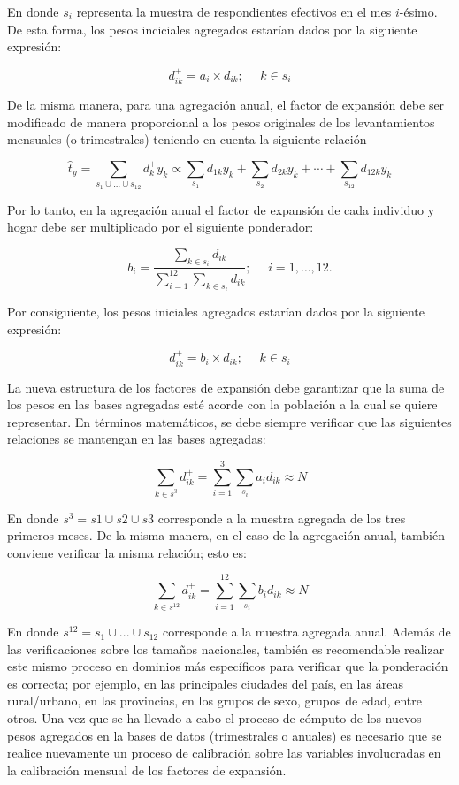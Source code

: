 \documentclass[
  12pt,
  spanish,
]{book}
\begin{document}
En donde \(s_i\) representa la muestra de respondientes efectivos en el mes \(i\)-ésimo. De esta forma, los pesos inciciales agregados estarían dados por la siguiente expresión:

\[
d_{ik}^+ = a_i \times d_{ik} ; \ \ \ \ \ \ k\in s_i
\]

De la misma manera, para una agregación anual, el factor de expansión
debe ser modificado de manera proporcional a los pesos originales de los
levantamientos mensuales (o trimestrales) teniendo en cuenta la
siguiente relación

\[
\hat{t}_y = \sum_{s_1 \cup ... \cup s_{12}} d_{k}^+ y_k
\propto 
\sum_{s_1} d_{1k} y_k + \sum_{s_2} d_{2k} y_k + \cdots + \sum_{s_{12}} d_{12k} y_k
\]

Por lo tanto, en la agregación anual el factor de expansión de cada
individuo y hogar debe ser multiplicado por el siguiente ponderador:

\[
b_i = \frac{\sum_{k\in s_i}d_{ik}}{\sum_{i=1}^{12}\sum_{k\in s_i}d_{ik}} ; \ \ \ \ \ \ i= 1, \ldots, 12.
\]

Por consiguiente, los pesos iniciales agregados estarían dados por la siguiente expresión:

\[
d_{ik}^+ = b_i \times d_{ik} ; \ \ \ \ \ \ k\in s_i
\]

La nueva estructura de los factores de expansión debe garantizar que la
suma de los pesos en las bases agregadas esté acorde con la población a
la cual se quiere representar. En términos matemáticos, se debe siempre
verificar que las siguientes relaciones se mantengan en las bases
agregadas:

\[
\sum_{k\in s^3} d_{ik}^+ = \sum_{i=1}^{3}\sum_{s_i} a_i d_{ik} \approx N
\]

En donde \(s^3=s1 \cup s2 \cup s3\) corresponde a la muestra agregada de los tres primeros meses. De la misma manera, en el caso de la agregación anual, también conviene verificar la misma relación; esto es:

\[
\sum_{k\in s^{12}} d_{ik}^+ = \sum_{i=1}^{12}\sum_{s_i} b_i d_{ik} \approx N
\]

En donde \(s^{12}=s_1 \cup ... \cup s_{12}\) corresponde a la muestra agregada anual. Además de las verificaciones sobre los tamaños nacionales, también es recomendable
realizar este mismo proceso en dominios más específicos para verificar
que la ponderación es correcta; por ejemplo, en las principales ciudades
del país, en las áreas rural/urbano, en las provincias, en los grupos de sexo, grupos de edad, entre otros. Una vez que se ha llevado a cabo el proceso de cómputo de
los nuevos pesos agregados en la bases de datos (trimestrales o
anuales) es necesario que se realice nuevamente un proceso de
calibración sobre las variables involucradas en la calibración mensual de los factores de expansión.
\end{document}
